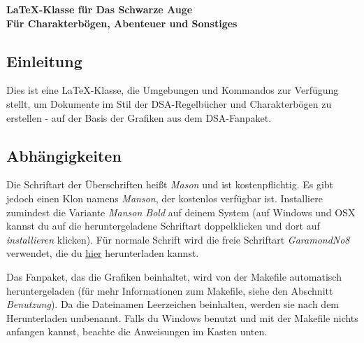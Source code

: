 \documentclass{dsa}
\begin{document}
   \begin{dsaTitlePage}
      \bfseries \Huge \LaTeX-Klasse für Das Schwarze Auge \\[15pt]
      \LARGE Für Charakterbögen, Abenteuer und Sonstiges
   \end{dsaTitlePage}
   
   
   \subsection*{Einleitung}
   
   Dies ist eine \LaTeX-Klasse, die Umgebungen und Kommandos zur Verfügung
   stellt, um Dokumente im Stil der DSA-Regelbücher und Charakterbögen zu 
   erstellen - auf der Basis der Grafiken aus dem DSA-Fanpaket.
   
   \subsection*{Abhängigkeiten}
   
   Die Schriftart der Überschriften heißt \textit{Mason} und ist
   kostenpflichtig. Es gibt jedoch einen Klon namens \textit{Manson}, der
   kostenlos verfügbar ist. Installiere zumindest die Variante
   \textit{Manson Bold} auf deinem System (auf Windows und OSX kannst du auf
   die heruntergeladene Schriftart doppelklicken und dort auf
   \textit{installieren} klicken). Für normale Schrift wird die freie Schriftart
   \textit{GaramondNo8} verwendet, die du \href{http://garamond.org}{hier}
   herunterladen kannst.
   
   Das Fanpaket, das die Grafiken beinhaltet, wird von der Makefile automatisch
   heruntergeladen (für mehr Informationen zum Makefile, siehe den Abschnitt
   \textit{Benutzung}). Da die Dateinamen Leerzeichen beinhalten, werden sie
   nach dem Herunterladen umbenannt. Falls du Windows benutzt und mit der
   Makefile nichts anfangen kannst, beachte die Anweisungen im Kasten unten.
   
   \vspace{12pt}
   
\end{document}
